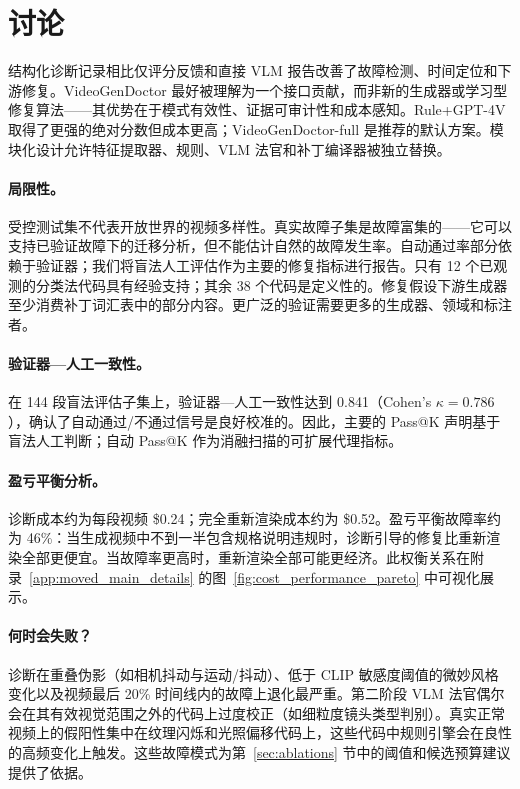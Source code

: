\documentclass{article}
\newcommand{\TaxonomyNumCodes}{12}
\newcommand{\TaxonomyTotalCodes}{38}
\newcommand{\VerifierHumanAgreement}{0.841}
\newcommand{\VerifierHumanKappa}{0.786}
\newcommand{\BreakEvenFailureRate}{46\%}
\begin{document}
\section{讨论}
\label{sec:discussion}

结构化诊断记录相比仅评分反馈和直接 VLM 报告改善了故障检测、时间定位和下游修复。VideoGenDoctor 最好被理解为一个接口贡献，而非新的生成器或学习型修复算法——其优势在于模式有效性、证据可审计性和成本感知。Rule+GPT-4V 取得了更强的绝对分数但成本更高；VideoGenDoctor-full 是推荐的默认方案。模块化设计允许特征提取器、规则、VLM 法官和补丁编译器被独立替换。

\paragraph{局限性。}
受控测试集不代表开放世界的视频多样性。真实故障子集是故障富集的——它可以支持已验证故障下的迁移分析，但不能估计自然的故障发生率。自动通过率部分依赖于验证器；我们将盲法人工评估作为主要的修复指标进行报告。只有 \TaxonomyNumCodes{} 个已观测的分类法代码具有经验支持；其余 \TaxonomyTotalCodes{} 个代码是定义性的。修复假设下游生成器至少消费补丁词汇表中的部分内容。更广泛的验证需要更多的生成器、领域和标注者。

\paragraph{验证器—人工一致性。}
在 144 段盲法评估子集上，验证器—人工一致性达到 \VerifierHumanAgreement{}（Cohen's $\kappa = \VerifierHumanKappa$），确认了自动通过/不通过信号是良好校准的。因此，主要的 Pass@K 声明基于盲法人工判断；自动 Pass@K 作为消融扫描的可扩展代理指标。

\paragraph{盈亏平衡分析。}
诊断成本约为每段视频 \$0.24；完全重新渲染成本约为 \$0.52。盈亏平衡故障率约为 \BreakEvenFailureRate：当生成视频中不到一半包含规格说明违规时，诊断引导的修复比重新渲染全部更便宜。当故障率更高时，重新渲染全部可能更经济。此权衡关系在附录~\ref{app:moved_main_details} 的图~\ref{fig:cost_performance_pareto} 中可视化展示。

\paragraph{何时会失败？}
诊断在重叠伪影（如相机抖动与运动/抖动）、低于 CLIP 敏感度阈值的微妙风格变化以及视频最后 20\% 时间线内的故障上退化最严重。第二阶段 VLM 法官偶尔会在其有效视觉范围之外的代码上过度校正（如细粒度镜头类型判别）。真实正常视频上的假阳性集中在纹理闪烁和光照偏移代码上，这些代码中规则引擎会在良性的高频变化上触发。这些故障模式为第~\ref{sec:ablations} 节中的阈值和候选预算建议提供了依据。
\end{document}
